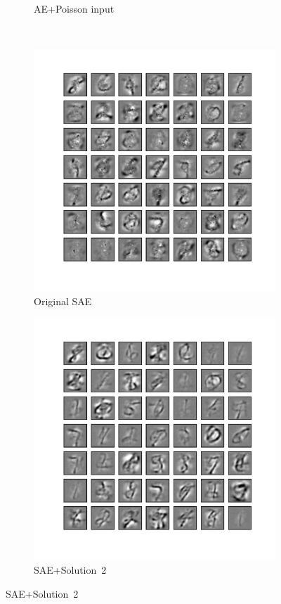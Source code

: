 \begin{figure}
\begin{subfigure}[t]{0.4\textwidth}
		\caption{AE+Poisson input}
	\end{subfigure}\\
	\begin{subfigure}[t]{0.4\textwidth}
		\includegraphics[width=\textwidth]{pics_sdlm/40_MNIST_SAE_original/2_60000_0.pdf}
		\caption{Original SAE}
	\end{subfigure}
	\begin{subfigure}[t]{0.4\textwidth}
		\includegraphics[width=\textwidth]{pics_sdlm/42_MNIST_SAE_noise/2_60000_0.pdf}
		\caption{SAE+Solution~2}
		

\end{subfigure}
\end{figure}
